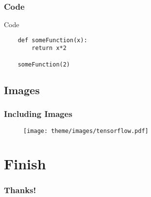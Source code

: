 \documentclass{beamer}
\begin{document}
\subsubsection{Code}
\begin{frame}[fragile=singleslide]{Code}
	\begin{lstlisting}
	def someFunction(x):
		return x*2

	someFunction(2)
	\end{lstlisting}
\end{frame}

\subsection{Images}
\begin{frame}
	\frametitle{Including Images}

	\begin{figure}
		\centering
		\texttt{[image: theme/images/tensorflow.pdf]}
	\end{figure}

\end{frame}

\section{Finish}
\begin{frame}
	\frametitle{Thanks!}
\end{frame}
\end{document}
